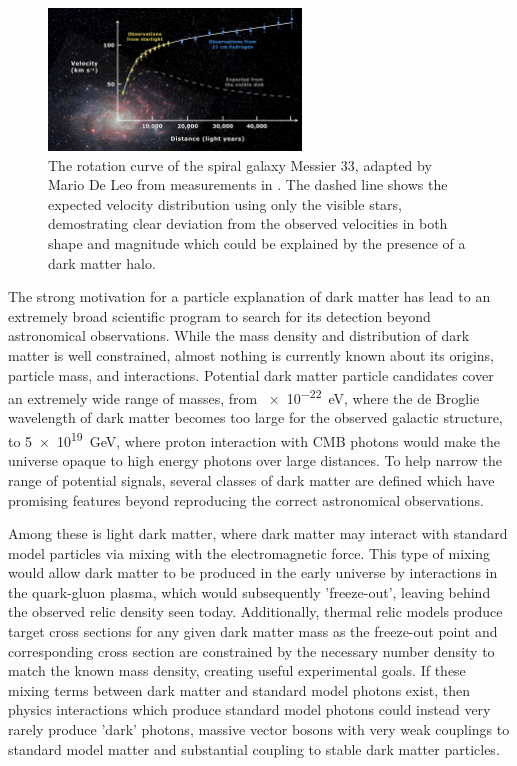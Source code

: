 \begin{figure}
   \label{fig:rotCurve}
   \includegraphics[width=0.6\textwidth]{figures/rotation_curve.png}
   \caption[Rotation curve of Messier 33]{The rotation curve of the spiral galaxy Messier 33, adapted by Mario De Leo from measurements in \cite{Corbelli}. The dashed line shows the expected velocity distribution using only the visible stars, demostrating clear deviation from the observed velocities in both shape and magnitude which could be explained by the presence of a dark matter halo.}
\end{figure}

The strong motivation for a particle explanation of dark matter has lead to an extremely broad scientific program to search for its detection beyond astronomical observations. 
While the mass density and distribution of dark matter is well constrained, almost nothing is currently known about its origins, particle mass, and interactions.
Potential dark matter particle candidates cover an extremely wide range of masses, from \SI{e-22}{\eV}, where the de Broglie wavelength of dark matter becomes too large for the observed galactic structure, to \SI{5e19}{\giga\eV}, where proton interaction with CMB photons would make the universe opaque to high energy photons over large distances.
To help narrow the range of potential signals, several classes of dark matter are defined which have promising features beyond reproducing the correct astronomical observations. 

Among these is light dark matter, where dark matter may interact with standard model particles via mixing with the electromagnetic force. 
This type of mixing would allow dark matter to be produced in the early universe by interactions in the quark-gluon plasma, which would subsequently 'freeze-out', leaving behind the observed relic density seen today. 
Additionally, thermal relic models produce target cross sections for any given dark matter mass as the freeze-out point and corresponding cross section are constrained by the necessary number density to match the known mass density, creating useful experimental goals.
If these mixing terms between dark matter and standard model photons exist, then physics interactions which produce standard model photons could instead very rarely produce 'dark' photons, massive vector bosons with very weak couplings to standard model matter and substantial coupling to stable dark matter particles.

